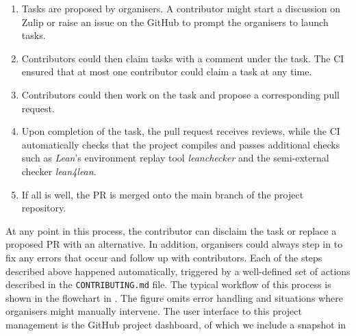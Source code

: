 \begin{enumerate}
    \item Tasks are proposed by organisers. A contributor might start a discussion on Zulip or raise an issue on the GitHub to prompt the organisers to launch tasks.
    \item Contributors could then claim tasks with a comment under the task. The CI ensured that at most one contributor could claim a task at any time.
    \item Contributors could then work on the task and propose a corresponding pull request.
    \item Upon completion of the task, the pull request receives reviews, while the CI automatically checks that the project compiles and passes additional checks such as \emph{Lean}'s environment replay tool \emph{leanchecker} and the semi-external checker \emph{lean4lean}\cite{lean4lean}.
    \item If all is well, the PR is merged onto the main branch of the project repository.
\end{enumerate}

At any point in this process, the contributor can disclaim the task or replace a proposed PR with an alternative. In addition, organisers could always step in to fix any errors that occur and follow up with contributors. Each of the steps described above happened automatically, triggered by a well-defined set of actions described in the \texttt{CONTRIBUTING.md} file. The typical workflow of this process is shown in the flowchart in . The figure omits error handling and situations where organisers might manually intervene. The user interface to this project management is the GitHub project dashboard, of which we include a snapshot in 

